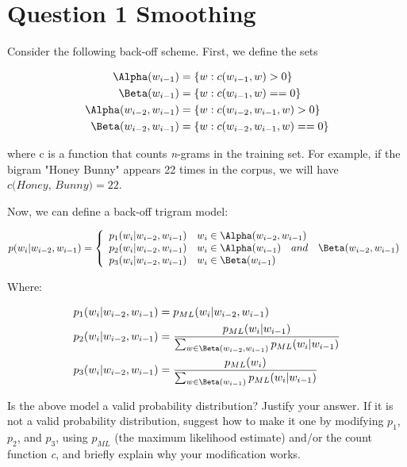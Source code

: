 \documentclass[11pt]{article}
\begin{document}
\section*{Question 1 Smoothing}
Consider the following back-off scheme. First, we define the sets

\begin{align}
	\begin{split}
		\Alpha(w_{i-1}) &= \{w : c(w_{i-1}, w) > 0\} \\
		\Beta(w_{i-1}) &= \{w : c(w_{i-1}, w) == 0\} \\
		\Alpha(w_{i-2}, w_{i-1}) &= \{w : c(w_{i-2}, w_{i-1}, w) > 0 \} \\
		\Beta(w_{i-2}, w_{i-1}) &= \{w : c(w_{i-2}, w_{i-1}, w) == 0 \} 
	\end{split}
\end{align}

where c is a function that counts \textit{n}-grams in the training set. For example, if the bigram "Honey Bunny" appears 22 times in the corpus, we will have $\textit{c(Honey, Bunny)} = 22$.

Now, we can define a back-off trigram model:

$$
 	p(w_i|w_{i-2}, w_{i-1}) = \left\{
		\begin{array}{lll}
			p_1(w_i|w_{i-2}, w_{i-1}) \quad {w_i} \in \Alpha(w_{i-2}, w_{i-1}) \\
			p_2(w_i|w_{i-2}, w_{i-1}) \quad {w_i} \in \Alpha(w_{i-1}) \quad and \quad \Beta(w_{i-2}, w_{i-1}) \\
			p_3(w_i|w_{i-2}, w_{i-1}) \quad {w_i} \in \Beta(w_{i-1})
		\end{array}
		\right.
$$

Where:

\begin{align}
	\begin{split}
		p_1(w_i|w_{i-2}, w_{i-1}) &= p_{ML}(w_i|w_{i-2}, w_{i-1}) \\
		p_2(w_i|w_{i-2}, w_{i-1}) &= \frac{p_{ML}(w_i|w_{i-1})}{\sum_{w\in\Beta(w_{i-2},w_{i-1})}p_{ML}(w_i|w_{i-1})} \\
		p_3(w_i|w_{i-2}, w_{i-1}) &=  \frac{p_{ML}(w_i)}{\sum_{w\in\Beta(w_{i-1})}p_{ML}(w_i|w_{i-1})}
	\end{split}
\end{align}

Is the above model a valid probability distribution? Justify your answer. If it is not a valid probability distribution, suggest how to make it one by modifying $p_1$, $p_2$, and $p_3$, using $p_{ML}$ (the maximum likelihood estimate) and/or the count function \textit{c}, and briefly explain why your modification works.
\end{document}
